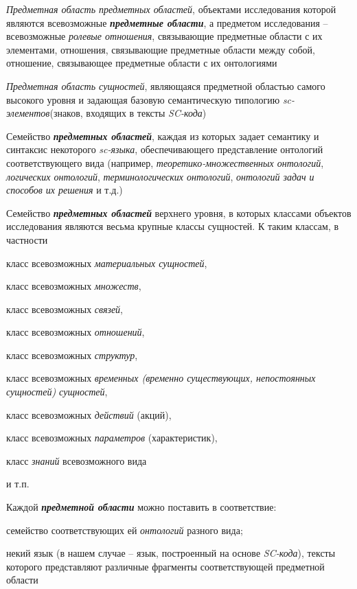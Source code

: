 \begin{SCn}
\begin{scnsubstruct}
{\begin{scnitemize}
\item \textit{Предметная область предметных областей}, объектами исследования которой являются всевозможные \textbf{\textit{предметные области}}, а предметом исследования -- всевозможные \textit{ролевые отношения}, связывающие предметные области с их элементами, отношения, связывающие предметные области между собой, отношение, связывающее предметные области с их онтологиями\item \textit{Предметная область сущностей}, являющаяся предметной областью самого высокого уровня и задающая базовую семантическую типологию \textit{sc-элементов}(знаков, входящих в тексты \textit{SC-кода})\item Семейство \textbf{\textit{предметных областей}}, каждая из которых задает семантику и синтаксис некоторого \textit{sc-языка}, обеспечивающего представление онтологий соответствующего вида (например, \textit{теоретико-множественных онтологий}, \textit{логических онтологий}, \textit{терминологических онтологий}, \textit{онтологий задач и способов их решения} и т.д.)\item Семейство \textbf{\textit{предметных областей}} верхнего уровня, в которых классами объектов исследования являются весьма крупные классы сущностей. К таким классам, в частности\begin{scnitemizeii}
\item класс всевозможных \textit{материальных сущностей},\item класс всевозможных \textit{множеств},\item класс всевозможных \textit{связей},\item класс всевозможных \textit{отношений},\item класс всевозможных \textit{структур},\item класс всевозможных \textit{временных (временно существующих, непостоянных сущностей) сущностей},\item класс всевозможных \textit{действий} (акций),\item класс всевозможных \textit{параметров} (характеристик),\item класс \textit{знаний} всевозможного вида \item и т.п.\end{scnitemizeii}
\end{scnitemize}
Каждой \textbf{\textit{предметной области}} можно поставить в соответствие:\begin{scnitemize}
\item семейство соответствующих ей \textit{онтологий} разного вида;\item некий язык (в нашем случае -- язык, построенный на основе \textit{SC-кода}), тексты которого представляют различные фрагменты соответствующей предметной области\end{scnitemize}
}
\end{scnsubstruct}
\end{SCn}
